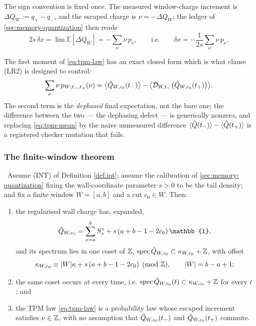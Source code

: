 The sign convention is fixed once. The measured window-charge increment is
$\Delta Q_W:=q_+-q_-$, and the escaped charge is $\nu=-\Delta Q_W$; the
ledger of \cref{sec:memory-quantization} then reads
\begin{equation}
  2s\,\delta x=\lim \mathbb{E}[\Delta Q_W]=-\sum_\nu \nu\,p_\nu,
  \qquad\text{i.e.}\qquad
  \delta x=-\frac{1}{2s}\sum_\nu \nu\,p_\nu .
  \label{eq:ledger}
\end{equation}

The first moment of \eqref{eq:tpm-law} has an exact closed form which is what
clause (LR2) is designed to control:
\begin{equation}
  \sum_\nu \nu\,p_{W;t_-,t_+}(\nu)
   =\bigl\langle \hat{Q}_{W,c_0}(t_-)\bigr\rangle
    -\bigl\langle \mathcal{D}_{W,t_-}\bigl(\hat{Q}_{W,c_0}(t_+)\bigr)\bigr\rangle .
  \label{eq:tpm-mean}
\end{equation}
The second term is the \emph{dephased} final expectation, not the bare one;
the difference between the two --- the dephasing defect --- is generically
nonzero, and replacing \eqref{eq:tpm-mean} by the naive unmeasured difference
$\langle\hat{Q}(t_-)\rangle-\langle\hat{Q}(t_+)\rangle$ is a registered checker
mutation that fails.

\subsubsection*{The finite-window theorem}

\begin{theorem}
\label{thm:fin}
\statusProved\
Assume (INT) of Definition \ref{def:int}; assume the calibration of
\cref{sec:memory-quantization} fixing the wall-coordinate parameter $s>0$ to
be the tail density; and fix a finite window $W=[a,b]$ and a cut $c_0\in W$.
Then:
\begin{enumerate}
\item[(i)] the regularised wall charge has, expanded,
  \begin{equation}
    \Qhat_{W,c_0}=\sum_{x=a}^{b}S^z_x+s\,(a+b-1-2c_0)\,\mathbb{1},
    \label{eq:qhat-expanded}
  \end{equation}
  and its spectrum lies in one coset of $\mathbb{Z}$,
  $\operatorname{spec}\hat{Q}_{W,c_0}\subset\kappa_{W,c_0}+\mathbb{Z}$, with offset
  \begin{equation}
    \kappa_{W,c_0}\equiv \lvert W\rvert\kappa+s\,(a+b-1-2c_0)
    \pmod{\mathbb{Z}},\qquad \lvert W\rvert=b-a+1;
    \label{eq:coset}
  \end{equation}
\item[(ii)] the same coset occurs at every time, i.e.
  $\operatorname{spec}\hat{Q}_{W,c_0}(t)\subset\kappa_{W,c_0}+\mathbb{Z}$ for every $t$; and
\item[(iii)] the TPM law \eqref{eq:tpm-law} is a probability law whose escaped
  increment satisfies $\nu\in\mathbb{Z}$, with no assumption that
  $\hat{Q}_{W,c_0}(t_-)$ and $\hat{Q}_{W,c_0}(t_+)$ commute.
\end{enumerate}
\end{theorem}

